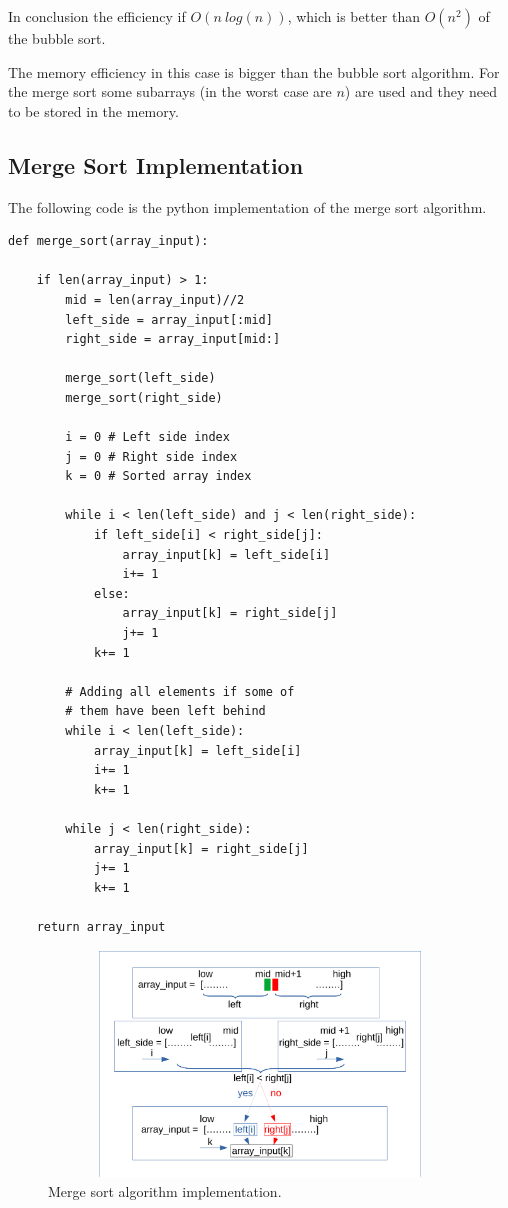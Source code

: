 In conclusion the efficiency if \(O(n \ log(n))\), which is better than \(O(n^{2})\) of the bubble sort. 

The memory efficiency in this case is bigger than the bubble sort algorithm. For the merge sort some subarrays (in the worst case are \(n\)) are used and they need to be stored in the memory.

\newpage
\subsection{Merge Sort Implementation}
The following code is the python implementation of the merge sort algorithm.
\begin{lstlisting}[caption={Merge Sort python implementation.}]
def merge_sort(array_input):
	
	if len(array_input) > 1:
		mid = len(array_input)//2
		left_side = array_input[:mid]
		right_side = array_input[mid:]
		
		merge_sort(left_side)
		merge_sort(right_side)
		
		i = 0 # Left side index
		j = 0 # Right side index
		k = 0 # Sorted array index
		
		while i < len(left_side) and j < len(right_side):
			if left_side[i] < right_side[j]:
				array_input[k] = left_side[i]
				i+= 1
			else:
				array_input[k] = right_side[j]
				j+= 1
			k+= 1
			
		# Adding all elements if some of 
        # them have been left behind 
        while i < len(left_side): 
        	array_input[k] = left_side[i] 
            i+= 1
            k+= 1
            
        while j < len(right_side): 
        	array_input[k] = right_side[j] 
            j+= 1
            k+= 1
			
	return array_input
\end{lstlisting}

\begin{figure}[hb]
	\includegraphics[width=14cm,height=6cm]{chapters/searchandsorting/images/sorting_7.pdf}
	\caption[]{Merge sort algorithm implementation.}
	\label{sorting_7}
\end{figure}

